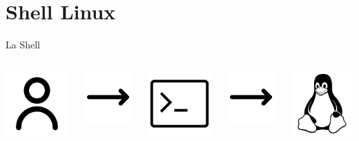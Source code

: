 \documentclass{beamer}
\begin{document}
    \section{Shell Linux}

    \begin{frame}{La Shell}
        \begin{columns}[t, onlytextwidth]
                \centering
                \includegraphics[height=2.5cm, keepaspectratio]{images/user.pdf}

                \centering
                \includegraphics[height=2cm, keepaspectratio]{images/rightarrow.pdf}
            
                \centering
                \includegraphics[height=2.5cm,keepaspectratio]{images/terminal.pdf}

                \centering
                \includegraphics[height=2cm, keepaspectratio]{images/rightarrow.pdf}

                \centering
                \includegraphics[height=2.5cm, keepaspectratio]{images/linux.pdf}
        \end{columns}
    \end{frame}
\end{document}
